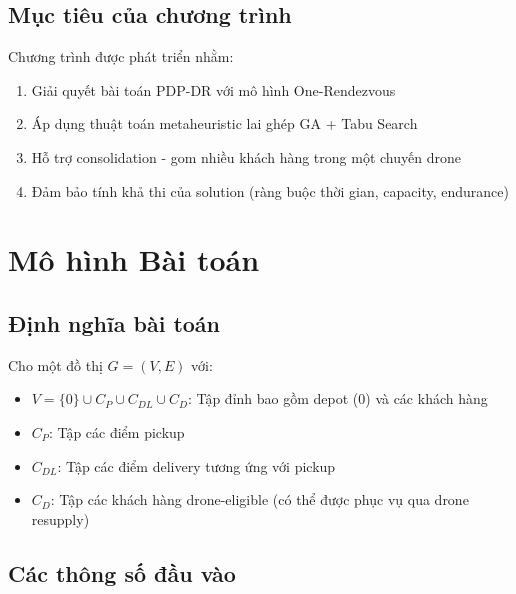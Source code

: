 \documentclass[12pt,a4paper]{article}
\begin{document}
\subsection{Mục tiêu của chương trình}

Chương trình được phát triển nhằm:
\begin{enumerate}
    \item Giải quyết bài toán PDP-DR với mô hình One-Rendezvous
    \item Áp dụng thuật toán metaheuristic lai ghép GA + Tabu Search
    \item Hỗ trợ consolidation - gom nhiều khách hàng trong một chuyến drone
    \item Đảm bảo tính khả thi của solution (ràng buộc thời gian, capacity, endurance)
\end{enumerate}

\section{Mô hình Bài toán}

\subsection{Định nghĩa bài toán}

Cho một đồ thị $G = (V, E)$ với:
\begin{itemize}
    \item $V = \{0\} \cup C_P \cup C_{DL} \cup C_D$: Tập đỉnh bao gồm depot (0) và các khách hàng
    \item $C_P$: Tập các điểm pickup
    \item $C_{DL}$: Tập các điểm delivery tương ứng với pickup
    \item $C_D$: Tập các khách hàng drone-eligible (có thể được phục vụ qua drone resupply)
\end{itemize}

\subsection{Các thông số đầu vào}
\end{document}
